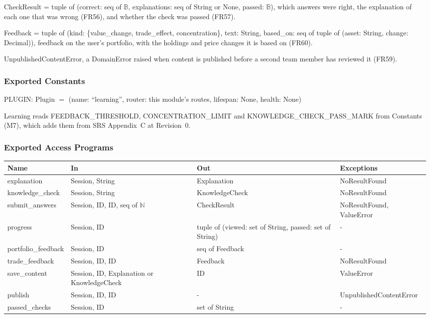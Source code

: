 \documentclass[12pt, titlepage]{article}
\begin{document}
\medskip
\noindent CheckResult = tuple of (correct: seq of $\mathbb{B}$, explanations:
seq of String or None, passed: $\mathbb{B}$), which answers were right, the
explanation of each one that was wrong (FR56), and whether the check was
passed (FR57).

\medskip
\noindent Feedback = tuple of (kind: \{value\_change, trade\_effect,
concentration\}, text: String, based\_on: seq of tuple of (asset: String,
change: Decimal)), feedback on the user's portfolio, with the holdings and
price changes it is based on (FR60).

\medskip
\noindent UnpublishedContentError, a DomainError raised when content is
published before a second team member has reviewed it (FR59).

\subsubsection{Exported Constants}

\noindent PLUGIN: Plugin $=$ (name: ``learning'', router: this module's
routes, lifespan: None, health: None)

\medskip
\noindent Learning reads FEEDBACK\_THRESHOLD, CONCENTRATION\_LIMIT and
KNOWLEDGE\_CHECK\_PASS\_MARK from Constants (M7), which adds them from SRS
Appendix~C at Revision~0.

\subsubsection{Exported Access Programs}

\begin{center}
\small
\setlength{\tabcolsep}{3pt}
\begin{tabular}{>{\raggedright\arraybackslash}p{3.9cm}
  >{\raggedright\arraybackslash}p{3.7cm}
  >{\raggedright\arraybackslash}p{3.4cm}
  >{\raggedright\arraybackslash}p{4.3cm}}
\toprule
\textbf{Name} & \textbf{In} & \textbf{Out} & \textbf{Exceptions} \\
\midrule
explanation & Session, String & Explanation & NoResultFound \\
knowledge\_check & Session, String & KnowledgeCheck & NoResultFound \\
submit\_answers & Session, ID, ID, seq of $\mathbb{N}$ & CheckResult &
NoResultFound, ValueError \\
progress & Session, ID & tuple of (viewed: set of String, passed: set of
String) & - \\
portfolio\_feedback & Session, ID & seq of Feedback & - \\
trade\_feedback & Session, ID, ID & Feedback & NoResultFound \\
save\_content & Session, ID, Explanation or KnowledgeCheck & ID & ValueError \\
publish & Session, ID, ID & - & Unpublished\allowbreak ContentError \\
passed\_checks & Session, ID & set of String & - \\
\bottomrule
\end{tabular}
\end{center}
\end{document}
